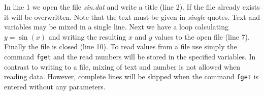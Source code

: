 In line 1 we open the file {\it sin.dat} and write a title (line 2).
If the file already exists it will be overwritten. Note that the
text must be given in {\it single} quotes. Text and variables may be
mixed in a single line. Next we have a loop calculating $y=\sin(x)$
and writing the resulting $x$ and $y$ values to the open file (line
7). Finally the file is closed (line 10). To read values from a file
use simply the command {\tt fget} and the read numbers will be
stored in the specified variables. In contrast to writing to a file,
mixing of text and number is not allowed when reading data. However,
complete lines will be skipped when the command {\tt fget} is
entered without any parameters.


%
%
%
%
%
